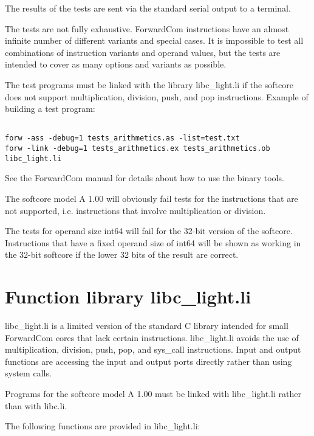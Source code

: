 \documentclass[11pt,a4paper,oneside,openright]{report}
\newcommand{\vv}{ \vspace{2mm} }   %
\begin{document}
The results of the tests are sent via the standard serial output to a terminal. 
\vv

The tests are not fully exhaustive. ForwardCom instructions have an almost infinite number of different variants and special cases. It is impossible to test all combinations of instruction variants and operand values, but the tests are intended to cover as many options and variants as possible.
\vv

The test programs must be linked with the library libc\_light.li if the softcore does not support multiplication, division, push, and pop instructions. 
Example of building a test program:

\begin{lstlisting}

forw -ass -debug=1 tests_arithmetics.as -list=test.txt 
forw -link -debug=1 tests_arithmetics.ex tests_arithmetics.ob libc_light.li
\end{lstlisting}
\vv

See the ForwardCom manual for details about how to use the binary tools.
\vv

The softcore model A 1.00 will obviously fail tests for the instructions that are not supported, i.e. instructions that involve multiplication or division. 
\vv

The tests for operand size int64 will fail for the 32-bit version of the softcore. Instructions that have a fixed operand size of int64 will be shown as working in the 32-bit softcore if the lower 32 bits of the result are correct.
\vv

\chapter{Function library libc\_light.li}
libc\_light.li is a limited version of the standard C library intended for small ForwardCom cores that lack certain instructions. libc\_light.li avoids the use of multiplication, division, push, pop, and sys\_call instructions. Input and output functions are accessing the input and output ports directly rather than using system calls.
\vv

Programs for the softcore model A 1.00 must be linked with libc\_light.li rather than with libc.li.
\vv

The following functions are provided in libc\_light.li:
\vv
\end{document}
